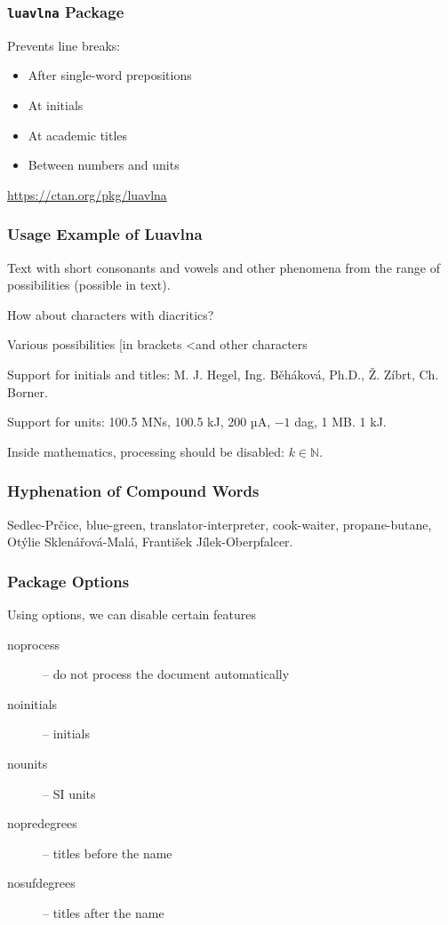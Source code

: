 \begin{frame}[fragile]
  \frametitle{\texttt{luavlna} Package}
    Prevents line breaks:
      \begin{itemize}
        \item After single-word prepositions
        \item At initials
        \item At academic titles
        \item Between numbers and units
      \end{itemize}
  \url{https://ctan.org/pkg/luavlna}
\end{frame}

\begin{frame}
  \frametitle{Usage Example of Luavlna}
  \begin{minipage}{3in}

    \preventsingledebugon

    Text with short consonants and vowels and other phenomena
    from the range of possibilities (possible in text).

    How about characters with diacritics?

    Various possibilities [in brackets \textless and other characters

    Support for initials and titles: M. J. Hegel, Ing. Běháková, Ph.D., Ž. Zíbrt,
    Ch. Borner.

    Support for units: 100.5 MN\cdot{}s, 100.5 kJ, 200 µA, $-1$ dag, 1 MB. 1 kJ.

    Inside mathematics, processing should be disabled: $k \in \mathbb N$.

    \preventsingledebugoff
  \end{minipage}
\end{frame}

\begin{frame}
    \frametitle{Hyphenation of Compound Words}
    \begin{center}
    \begin{minipage}{2in}
      Sedlec-Prčice, blue-green, translator-interpreter, cook-waiter, propane-butane, Otýlie Sklenářová-Malá, František Jílek-Oberpfalcer.
    \end{minipage}
  \end{center}
\end{frame}

\begin{frame}
  \frametitle{Package Options}
  Using options, we can disable certain features
  \begin{description}
    \item [noprocess] – do not process the document automatically
    \item [noinitials] – initials
    \item [nounits] – SI units
    \item [nopredegrees] – titles before the name
    \item [nosufdegrees] – titles after the name
  \end{description}
\end{frame}

